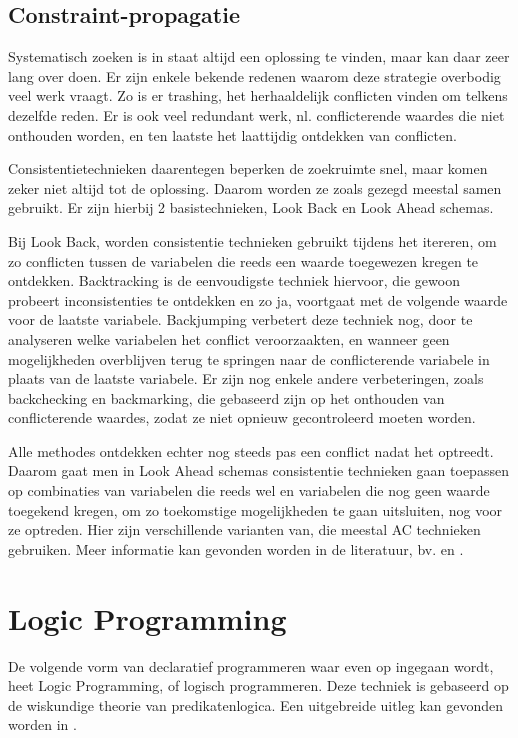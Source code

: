 \subsection{Constraint-propagatie}

Systematisch zoeken is in staat altijd een oplossing te vinden, maar kan daar zeer lang over doen. Er zijn enkele bekende redenen waarom deze strategie overbodig veel werk vraagt. Zo is er trashing, het herhaaldelijk conflicten vinden om telkens dezelfde reden. Er is ook veel redundant werk, nl. conflicterende waardes die niet onthouden worden, en ten laatste het laattijdig ontdekken van conflicten.

Consistentietechnieken daarentegen beperken de zoekruimte snel, maar komen zeker niet altijd tot de oplossing. Daarom worden ze zoals gezegd meestal samen gebruikt. Er zijn hierbij 2 basistechnieken, Look Back en Look Ahead schemas.

Bij Look Back, worden consistentie technieken gebruikt tijdens het itereren, om zo conflicten tussen de variabelen die reeds een waarde toegewezen kregen te ontdekken. Backtracking is de eenvoudigste techniek hiervoor, die gewoon probeert inconsistenties te ontdekken en zo ja, voortgaat met de volgende waarde voor de laatste variabele. Backjumping verbetert deze techniek nog, door te analyseren welke variabelen het conflict veroorzaakten, en wanneer geen mogelijkheden overblijven terug te springen naar de conflicterende variabele in plaats van de laatste variabele. Er zijn nog enkele andere verbeteringen, zoals backchecking en backmarking, die gebaseerd zijn op het onthouden van conflicterende waardes, zodat ze niet opnieuw gecontroleerd moeten worden.

Alle methodes ontdekken echter nog steeds pas een conflict nadat het optreedt. Daarom gaat men in Look Ahead schemas consistentie technieken gaan toepassen op combinaties van variabelen die reeds wel en variabelen die nog geen waarde toegekend kregen, om zo toekomstige mogelijkheden te gaan uitsluiten, nog voor ze optreden. Hier zijn verschillende varianten van, die meestal AC technieken gebruiken. Meer informatie kan gevonden worden in de literatuur, bv. \cite{bartak01} en \cite{bartak99constraint}.

\section{Logic Programming}

De volgende vorm van declaratief programmeren waar even op ingegaan wordt, heet Logic Programming, of logisch programmeren. Deze techniek is gebaseerd op de wiskundige theorie van predikatenlogica. Een uitgebreide uitleg kan gevonden worden in \cite{introlp}.


